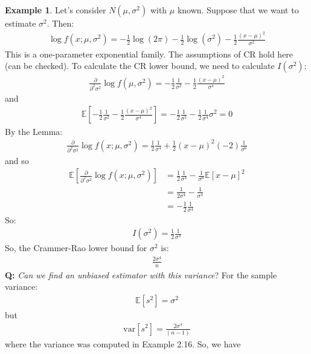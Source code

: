 \documentclass[11pt]{scrartcl}
\theoremstyle{definition}
\newtheorem{ex}{Example}
\theoremstyle{remark}
\newcommand{\EX}[1]{\mathbb{E}\left[#1 \right]}
\begin{document}
\begin{ex} 
	Let's consider $N(\mu, \sigma^2)$ with $\mu$ known. Suppose that we want to estimate $\sigma^2$. Then: 
	\begin{align*}
		\log f(x; \mu, \sigma^2) = - \frac{1}{2}	 \log (2 \pi) - \frac{1}{2} \log (\sigma^2) - \frac{1}{2} \frac{(x-\mu)^2}{\sigma^2}
	\end{align*}
	This is a one-parameter exponential family. The assumptions of CR hold here (can be checked). To calculate the CR lower bound, we need to calculate $I(\sigma^2)$: 
	\begin{align*}
			\frac{\partial}{\partial^2 \sigma^2} \log f(\mu, \sigma^2) = - \frac{1}{2} \frac{1}{\sigma^2} - \frac{1}{2} \frac{(x-\mu)^2}{\sigma^4}
	\end{align*}
	and
	\begin{align*}
		\EX{- \frac{1}{2} \frac{1}{\sigma^2} - \frac{1}{2} \frac{(x-\mu)^2}{\sigma^4}} = -\frac{1}{2} \frac{1}{\sigma^2} - \frac{1}{2} \frac{1}{\sigma^4} \sigma^2 = 0 
	\end{align*}
	By the Lemma: 
	\begin{align*}
		\frac{\partial}{\partial^2 \sigma^2}	 \log f(x; \mu, \sigma^2) = \frac{1}{2} \frac{1}{\sigma^4} + \frac{1}{2} (x-\mu)^2(-2)\frac{1}{\sigma^6}	
	\end{align*}
	and so
	\begin{align*}
		\EX{\frac{\partial}{\partial^2 \sigma^2}	 \log f(x; \mu, \sigma^2)} & = \frac{1}{2} \frac{1}{\sigma^4} - \frac{1}{\sigma^6} \EX{x-\mu}^2 \\
			& = \frac{1}{2 \sigma^4} - \frac{1}{\sigma^4} \\
			& = -\frac{1}{2}\frac{1}{\sigma^4}
	\end{align*}
	So: 
	\begin{align*}
		I(\sigma^2) = \frac{1}{2} \frac{1}{\sigma^4}
	\end{align*}
	So, the Crammer-Rao lower bound  for $\sigma^2$ is: 
	\begin{align*}
		\frac{2 \sigma^4}{n}
	\end{align*}
	\textbf{Q:} \emph{Can we find an unbiased estimator with this variance}? For the sample variance: 
	\begin{align*}
		\EX{s^2} = \sigma^2 	
	\end{align*}
	but
	\begin{align*}
		\text{var}[s^2] = \frac{2 \sigma^4}{(n-1)}
	\end{align*}
	where the variance was computed in Example 2.16. So, we have
	\begin{align*}

\end{align*}
\end{ex}
\end{document}
